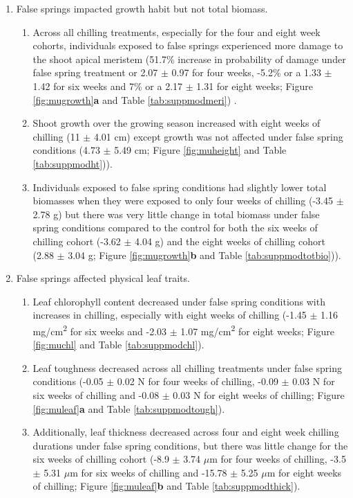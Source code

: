 \documentclass{article}\usepackage[]{graphicx}\usepackage[]{color}
\begin{document}
\begin{enumerate}
\item False springs impacted growth habit but not total biomass. 
  \begin{enumerate}
  \item Across all chilling treatments, especially for the four and eight week cohorts, individuals exposed to false springs experienced more damage to the shoot apical meristem (51.7\% increase in probability of damage under false spring treatment or 2.07 $\pm$ 0.97 for four weeks, -5.2\% or a 1.33 $\pm$ 1.42 for six weeks and 7\% or a 2.17 $\pm$ 1.31 for eight weeks; Figure \ref{fig:mugrowth}\textbf{a} and Table \ref{tab:suppmodmeri}) .
  \item Shoot growth over the growing season increased with eight weeks of chilling (11 $\pm$ 4.01 cm) except growth was not affected under false spring conditions (4.73 $\pm$ 5.49 cm; Figure \ref{fig:muheight} and Table \ref{tab:suppmodht})). %
  \item Individuals exposed to false spring conditions had slightly lower total biomasses when they were exposed to only four weeks of chilling (-3.45 $\pm$ 2.78 g) but there was very little change in total biomass under false spring conditions compared to the control for both the six weeks of chilling cohort (-3.62 $\pm$ 4.04 g) and the eight weeks of chilling cohort (2.88 $\pm$ 3.04 g; Figure \ref{fig:mugrowth}\textbf{b} and Table \ref{tab:suppmodtotbio})).
  \end{enumerate}
  
\item False springs affected physical leaf traits.
  \begin{enumerate}
  \item Leaf chlorophyll content decreased under false spring conditions with increases in chilling, especially with eight weeks of chilling (-1.45 $\pm$ 1.16 mg/cm\textsuperscript{2} for six weeks and -2.03 $\pm$ 1.07 mg/cm\textsuperscript{2} for eight weeks; Figure \ref{fig:muchl} and Table \ref{tab:suppmodchl}).
  \item Leaf toughness decreased across all chilling treatments under false spring conditions (-0.05 $\pm$ 0.02 N for four weeks of chilling, -0.09 $\pm$ 0.03 N for six weeks of chilling and -0.08 $\pm$ 0.03 N for eight weeks of chilling; Figure \ref{fig:muleaf}\textbf{a} and Table \ref{tab:suppmodtough}).
  \item Additionally, leaf thickness decreased across four and eight week chilling durations under false spring conditions, but there was little change for the six weeks of chilling cohort (-8.9 $\pm$ 3.74 $\mu$m for four weeks of chilling, -3.5 $\pm$ 5.31 $\mu$m for six weeks of chilling and -15.78 $\pm$ 5.25 $\mu$m for eight weeks of chilling; Figure \ref{fig:muleaf}\textbf{b} and Table \ref{tab:suppmodthick}).
  \end{enumerate}
  

\end{enumerate}
\end{document}

